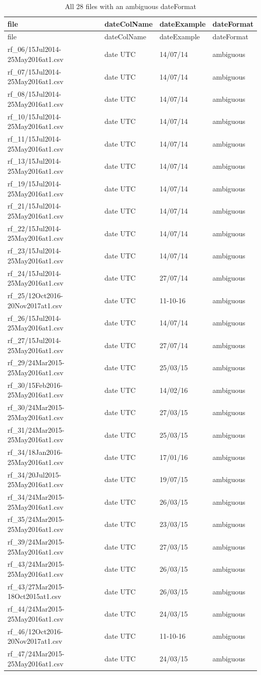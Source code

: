 \documentclass[]{article}
\begin{document}
\begin{longtable}[]{@{}llll@{}}
\caption{All 28 files with an ambiguous dateFormat}\tabularnewline
\toprule
file & dateColName & dateExample & dateFormat\tabularnewline
\midrule
\endfirsthead
\toprule
file & dateColName & dateExample & dateFormat\tabularnewline
\midrule
\endhead
rf\_06/15Jul2014-25May2016at1.csv & date UTC & 14/07/14 &
ambiguous\tabularnewline
rf\_07/15Jul2014-25May2016at1.csv & date UTC & 14/07/14 &
ambiguous\tabularnewline
rf\_08/15Jul2014-25May2016at1.csv & date UTC & 14/07/14 &
ambiguous\tabularnewline
rf\_10/15Jul2014-25May2016at1.csv & date UTC & 14/07/14 &
ambiguous\tabularnewline
rf\_11/15Jul2014-25May2016at1.csv & date UTC & 14/07/14 &
ambiguous\tabularnewline
rf\_13/15Jul2014-25May2016at1.csv & date UTC & 14/07/14 &
ambiguous\tabularnewline
rf\_19/15Jul2014-25May2016at1.csv & date UTC & 14/07/14 &
ambiguous\tabularnewline
rf\_21/15Jul2014-25May2016at1.csv & date UTC & 14/07/14 &
ambiguous\tabularnewline
rf\_22/15Jul2014-25May2016at1.csv & date UTC & 14/07/14 &
ambiguous\tabularnewline
rf\_23/15Jul2014-25May2016at1.csv & date UTC & 14/07/14 &
ambiguous\tabularnewline
rf\_24/15Jul2014-25May2016at1.csv & date UTC & 27/07/14 &
ambiguous\tabularnewline
rf\_25/12Oct2016-20Nov2017at1.csv & date UTC & 11-10-16 &
ambiguous\tabularnewline
rf\_26/15Jul2014-25May2016at1.csv & date UTC & 14/07/14 &
ambiguous\tabularnewline
rf\_27/15Jul2014-25May2016at1.csv & date UTC & 27/07/14 &
ambiguous\tabularnewline
rf\_29/24Mar2015-25May2016at1.csv & date UTC & 25/03/15 &
ambiguous\tabularnewline
rf\_30/15Feb2016-25May2016at1.csv & date UTC & 14/02/16 &
ambiguous\tabularnewline
rf\_30/24Mar2015-25May2016at1.csv & date UTC & 27/03/15 &
ambiguous\tabularnewline
rf\_31/24Mar2015-25May2016at1.csv & date UTC & 25/03/15 &
ambiguous\tabularnewline
rf\_34/18Jan2016-25May2016at1.csv & date UTC & 17/01/16 &
ambiguous\tabularnewline
rf\_34/20Jul2015-25May2016at1.csv & date UTC & 19/07/15 &
ambiguous\tabularnewline
rf\_34/24Mar2015-25May2016at1.csv & date UTC & 26/03/15 &
ambiguous\tabularnewline
rf\_35/24Mar2015-25May2016at1.csv & date UTC & 23/03/15 &
ambiguous\tabularnewline
rf\_39/24Mar2015-25May2016at1.csv & date UTC & 27/03/15 &
ambiguous\tabularnewline
rf\_43/24Mar2015-25May2016at1.csv & date UTC & 26/03/15 &
ambiguous\tabularnewline
rf\_43/27Mar2015-18Oct2015at1.csv & date UTC & 26/03/15 &
ambiguous\tabularnewline
rf\_44/24Mar2015-25May2016at1.csv & date UTC & 24/03/15 &
ambiguous\tabularnewline
rf\_46/12Oct2016-20Nov2017at1.csv & date UTC & 11-10-16 &
ambiguous\tabularnewline
rf\_47/24Mar2015-25May2016at1.csv & date UTC & 24/03/15 &
ambiguous\tabularnewline
\bottomrule
\end{longtable}
\end{document}
